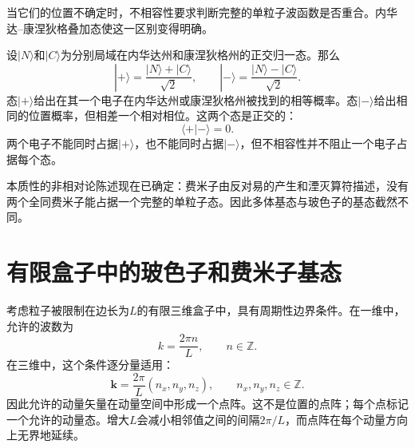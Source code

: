 当它们的位置不确定时，不相容性要求判断完整的单粒子波函数是否重合。内华达--康涅狄格叠加态使这一区别变得明确。

设\(|N\rangle\)和\(|C\rangle\)为分别局域在内华达州和康涅狄格州的正交归一态。那么
\begin{equation}
|+\rangle=\frac{|N\rangle+|C\rangle}{\sqrt2},
\qquad
|-\rangle=\frac{|N\rangle-|C\rangle}{\sqrt2}.
\end{equation}
态\(|+\rangle\)给出在其一个电子在内华达州或康涅狄格州被找到的相等概率。态\(|-\rangle\)给出相同的位置概率，但相差一个相对相位。这两个态是正交的：
\begin{equation}
\langle+|-\rangle=0.
\end{equation}
两个电子不能同时占据\(|+\rangle\)，也不能同时占据\(|-\rangle\)，但不相容性并不阻止一个电子占据每个态。

\begin{classroomqa}
\end{classroomqa}

\begin{classroomqa}
\end{classroomqa}

本质性的非相对论陈述现在已确定：费米子由反对易的产生和湮灭算符描述，没有两个全同费米子能占据一个完整的单粒子态。因此多体基态与玻色子的基态截然不同。

\section{有限盒子中的玻色子和费米子基态}

考虑粒子被限制在边长为\(L\)的有限三维盒子中，具有周期性边界条件。在一维中，允许的波数为
\begin{equation}
k=\frac{2\pi n}{L},
\qquad n\in\mathbb{Z}.
\end{equation}
在三维中，这个条件逐分量适用：
\begin{equation}
\mathbf{k}=\frac{2\pi}{L}(n_x,n_y,n_z),
\qquad n_x,n_y,n_z\in\mathbb{Z}.
\end{equation}
因此允许的动量矢量在动量空间中形成一个点阵。这不是位置的点阵；每个点标记一个允许的动量态。增大\(L\)会减小相邻值之间的间隔\(2\pi/L\)，而点阵在每个动量方向上无界地延续。

